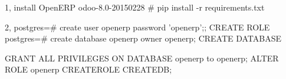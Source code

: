 
1, install OpenERP
odoo-8.0-20150228 # pip install -r requirements.txt 

2,
postgres=# create user openerp password 'openerp';;
CREATE ROLE
postgres=# create database openerp owner openerp;
CREATE DATABASE

GRANT ALL PRIVILEGES ON DATABASE openerp to openerp;
ALTER ROLE openerp CREATEROLE CREATEDB;

